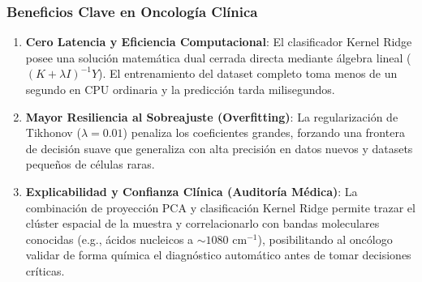 \subsubsection{Beneficios Clave en Oncología Clínica}
\begin{enumerate}
    \item \textbf{Cero Latencia y Eficiencia Computacional}: El clasificador Kernel Ridge posee una solución matemática dual cerrada directa mediante álgebra lineal ($ (K + \lambda I)^{-1} Y $). El entrenamiento del dataset completo toma menos de un segundo en CPU ordinaria y la predicción tarda milisegundos.
    \item \textbf{Mayor Resiliencia al Sobreajuste (Overfitting)}: La regularización de Tikhonov ($\lambda=0.01$) penaliza los coeficientes grandes, forzando una frontera de decisión suave que generaliza con alta precisión en datos nuevos y datasets pequeños de células raras.
    \item \textbf{Explicabilidad y Confianza Clínica (Auditoría Médica)}: La combinación de proyección PCA y clasificación Kernel Ridge permite trazar el clúster espacial de la muestra y correlacionarlo con bandas moleculares conocidas (e.g., ácidos nucleicos a $\sim1080$ cm$^{-1}$), posibilitando al oncólogo validar de forma química el diagnóstico automático antes de tomar decisiones críticas.
\end{enumerate}

